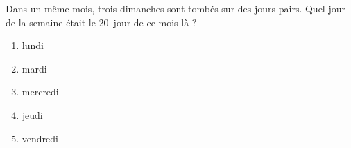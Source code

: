 Dans un même mois, trois dimanches sont tombés sur des jours pairs. Quel jour de la semaine était le 20\ieme\ jour de ce mois-là ?
\begin{multicols}{5}
  \begin{enumerate}[A/]
  \item lundi
  \item mardi
  \item mercredi
  \item jeudi
  \item vendredi
  \end{enumerate}
\end{multicols}